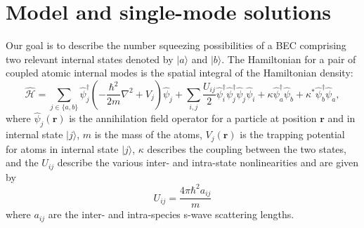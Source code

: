 \documentclass{iopart}
\begin{document}
\section{Model and single-mode solutions}
\label{secTwoModeAnalytic}
Our goal is to describe the number squeezing possibilities of a BEC comprising two relevant internal states denoted by $|a\rangle$ and $|b\rangle$.  The Hamiltonian for a pair of coupled atomic internal modes is the spatial integral of the Hamiltonian density:
\begin{equation}
\hat{\mathcal{H}} = \sum_{j\in \{a,b\}} \hat{\psi}_j^{\dagger}\left(-\frac{\hbar^2}{2 m}\nabla^2+V_j\right)\hat{\psi}_j 
          + \sum_{i,j}\frac{U_{i j}}{2} \hat{\psi}_i^{\dagger} \hat{\psi}_j^{\dagger} \hat{\psi}_j \hat{\psi}_i
          + \kappa \hat{\psi}_a^{\dagger} \hat{\psi}_b + \kappa^* \hat{\psi}_b^{\dagger}  \hat{\psi}_a,
\label{eqFieldHamiltonian}
\end{equation}
where $\hat{\psi}_j(\mathbf{r})$ is the annihilation field operator for a particle at position $\mathbf{r}$ and in internal state $|j\rangle$, $m$ is the mass of the atoms, $V_j(\mathbf{r})$ is the trapping potential for atoms in internal state $|j\rangle$, $\kappa$ describes the coupling between the two states, and the $U_{ij}$ describe the various inter- and intra-state nonlinearities and are given by
\begin{equation}
U_{ij} = \frac{4 \pi \hbar^2 a_{ij}} {m}
\label{eqUij}
\end{equation}
where $a_{ij}$ are the inter- and intra-species s-wave scattering lengths.
\end{document}
